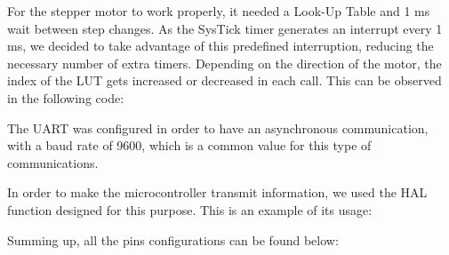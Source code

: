 For the stepper motor to work properly, it needed a Look-Up Table and 1 ms wait between step changes. As the SysTick timer generates an interrupt every 1 ms, we decided to take advantage of this predefined interruption, reducing the necessary number of extra timers. Depending on the direction of the motor, the index of the LUT gets increased or decreased in each call. This can be observed in the following code:


\medskip

The UART was configured in order to have an asynchronous communication, with a baud rate of 9600, which is a common value for this type of communications.\medskip

In order to make the microcontroller transmit information, we used the HAL function designed for this purpose. This is an example of its usage:


\medskip

Summing up, all the pins configurations can be found below:

